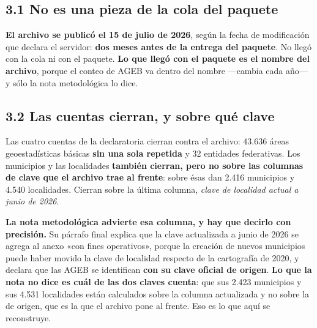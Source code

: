 \subsection*{3.1 No es una pieza de la cola del paquete}

\textbf{El archivo se publicó el 15 de julio de 2026}, según la fecha de modificación que
declara el servidor: \textbf{dos meses antes de la entrega del paquete}. No llegó con la cola
ni con el paquete. \textbf{Lo que llegó con el paquete es el nombre del archivo}, porque el
conteo de AGEB va dentro del nombre ---cambia cada año--- y sólo la nota metodológica lo
dice.


\subsection*{3.2 Las cuentas cierran, y sobre qué clave}



Las cuatro cuentas de la declaratoria cierran contra el archivo: 43.636 áreas
geoestadísticas básicas \textbf{sin una sola repetida} y 32 entidades federativas. Los
municipios y las localidades \textbf{también cierran, pero no sobre las columnas de clave
que el archivo trae al frente}: sobre ésas dan 2.416 municipios y 4.540 localidades.
Cierran sobre la última columna, \emph{clave de localidad actual a junio de 2026}.

\textbf{La nota metodológica advierte esa columna, y hay que decirlo con precisión.} Su
párrafo final explica que la clave actualizada a junio de 2026 se agrega al anexo «con fines
operativos», porque la creación de nuevos municipios puede haber movido la clave de localidad
respecto de la cartografía de 2020, y declara que las AGEB se identifican \textbf{con su clave
oficial de origen}. \textbf{Lo que la nota no dice es cuál de las dos claves cuenta}: que sus
2.423 municipios y sus 4.531 localidades están calculados sobre la columna actualizada y no
sobre la de origen, que es la que el archivo pone al frente. Eso es lo que aquí se reconstruye.


